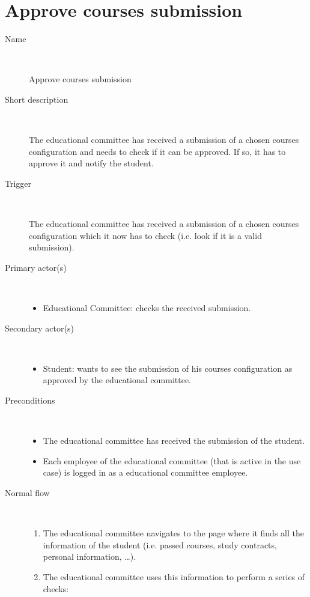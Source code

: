\section{Approve courses submission}

\begin{description}
	\item[Name] \
		\par Approve courses submission
	\item[Short description] \ 
			\par The educational committee has received a submission of a chosen courses
			configuration and needs to check if it can be approved. If so, it has to
			approve it and notify the student.
	\item[Trigger] \ 
			\par The educational committee has received a submission of a chosen courses
			configuration which it now has to check (i.e. look if it is a valid submission).
	\item[Primary actor(s)] \ 
		\begin{itemize}
		  \item Educational Committee: checks the received submission.
		\end{itemize}
	\item[Secondary actor(s)] \ 
		\begin{itemize}
		  \item Student: wants to see the submission of his courses configuration as
		  approved by the educational committee.
		\end{itemize} 
	\item[Preconditions] \ 
	\begin{itemize}
		\item The educational committee has received the submission of the student.
		\item Each employee of the educational committee (that is active in the use
		case) is logged in as a educational committee employee.
	\end{itemize}
	\item[Normal flow] \ 
	\begin{enumerate}
	  	\item The educational committee navigates to the page where it finds all the
	  	information of the student (i.e. passed courses, study contracts, personal
	  	information, \ldots).
	  	\item The educational committee uses this information to perform a series of
	  	checks:
	  	\begin{enumerate}

\end{enumerate}
\end{enumerate}
\end{description}
